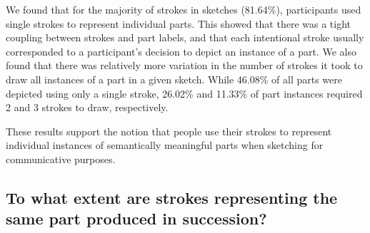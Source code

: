 \documentclass[10pt,letterpaper]{article}
\begin{document}
We found that for the majority of strokes in sketches (81.64\%), participants used single strokes to represent individual parts. This showed that there was a tight coupling between strokes and part labels, and that each intentional stroke usually corresponded to a participant's decision to depict an instance of a part.
We also found that there was relatively more variation in the number of strokes it took to draw all instances of a part in a given sketch. While 46.08\% of all parts were depicted using only a single stroke, 26.02\% and 11.33\% of part instances required 2 and 3 strokes to draw, respectively. 

These results support the notion that people use their strokes to represent individual instances of semantically meaningful parts when sketching for  communicative purposes.



\subsection{To what extent are strokes representing the same part produced in succession?}
\end{document}
